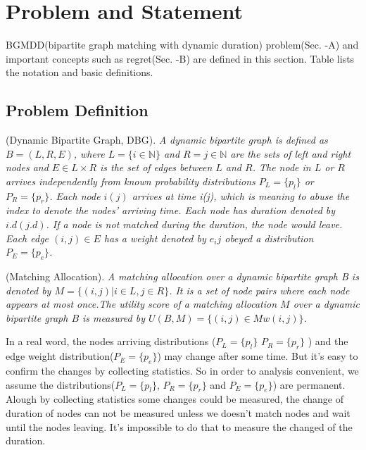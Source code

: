 \section{Problem and Statement}
\label{sec:model}

BGMDD(bipartite graph matching with dynamic duration) problem(Sec. \uppercase\expandafter{}-A)  and important concepts such as regret(Sec. \uppercase\expandafter{}-B) are defined in this section. Table \uppercase\expandafter{} lists the notation and basic definitions.

\subsection{Problem Definition}

\begin{definition}
(Dynamic Bipartite Graph, DBG). \emph{A dynamic bipartite graph is defined as $B=(L,R,E)$, where $L=\{i \in \mathbb{N}\}$ and  $R={j \in \mathbb{N}}$ are  the sets of left and right nodes and $E\in L\times R$ is the set of edges between $L$ and $R$. The node in $L$ or $R$ arrives independently from known probability distributions $P_{L}=\{p_l\}$ or $P_{R}=\{p_r\}$. Each node $i(j)$ arrives at time i(j), which is meaning to abuse the index to denote the nodes' arriving time. Each node has duration denoted by $i.d(j.d)$. If a node is not matched during the duration, the node would leave. Each edge $(i,j)\in E$ has a weight denoted by $e_ij$ obeyed a distribution $P_E=\{p_e\}$.}
\end{definition}
\begin{definition}
(Matching Allocation). \emph{A matching allocation over a dynamic bipartite graph B is denoted by $M =\{(i, j)|i \in L, j \in R\}$. It is a set of node pairs where each node appears at most once.The utility score of a matching allocation $M$ over a dynamic bipartite graph $B$ is measured by $U(B, M) = \{(i,j)\in M w(i, j)\}$.}
\end{definition}

\par In a real word, the nodes arriving distributions ($P_{L}=\{p_l\}$  $P_{R}=\{p_r\}$ ) and the edge weight distribution($P_E=\{p_e\}$) may change after some time. But it's easy to confirm the changes by collecting statistics. So in order to analysis convenient, we assume the distributions($P_{L}=\{p_l\}$, $P_{R}=\{p_r\}$ and $P_E=\{p_e\}$) are permanent. Alough by collecting statistics some changes could be measured, the change of duration of nodes can not be measured unless we doesn't match nodes and wait until the nodes leaving. It's impossible to do that to measure the changed of the duration. 


